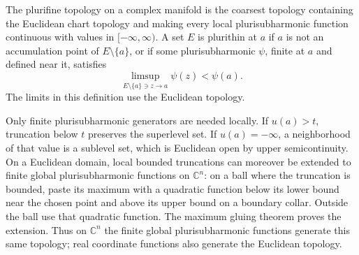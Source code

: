 \begin{definition}\label{def:plurifine-topology}
The plurifine topology on a complex manifold is the coarsest topology containing the Euclidean chart topology and making every local plurisubharmonic function continuous with values in $[-\infty,\infty)$. A set $E$ is plurithin at $a$ if $a$ is not an accumulation point of $E\setminus\{a\}$, or if some plurisubharmonic $\psi$, finite at $a$ and defined near it, satisfies
\[
 \limsup_{E\setminus\{a\}\ni z\to a}\psi(z)<\psi(a).
\]
The limits in this definition use the Euclidean topology.
\end{definition}

Only finite plurisubharmonic generators are needed locally. If $u(a)>t$, truncation below $t$ preserves the superlevel set. If $u(a)=-\infty$, a neighborhood of that value is a sublevel set, which is Euclidean open by upper semicontinuity. On a Euclidean domain, local bounded truncations can moreover be extended to finite global plurisubharmonic functions on $\mathbb C^n$: on a ball where the truncation is bounded, paste its maximum with a quadratic function below its lower bound near the chosen point and above its upper bound on a boundary collar. Outside the ball use that quadratic function. The maximum gluing theorem proves the extension. Thus on $\mathbb C^n$ the finite global plurisubharmonic functions generate this same topology; real coordinate functions also generate the Euclidean topology.

